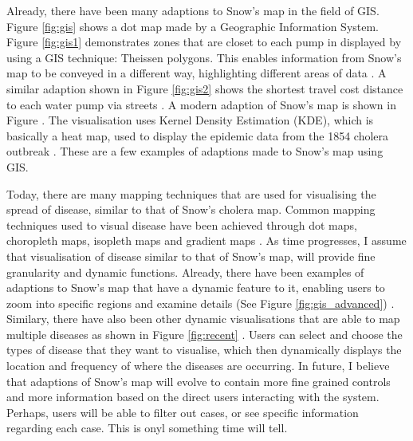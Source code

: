 \documentclass[12pt]{article}
\begin{document}
Already, there have been many adaptions to Snow's map in the field of GIS. Figure \ref{fig:gis} shows a dot map made by a Geographic Information System. Figure \ref{fig:gis1} demonstrates zones that are closet to each pump in displayed by using a GIS technique: Theissen polygons. This enables information from Snow's map to be conveyed in a different way, highlighting different areas of data \cite{udel2}. A similar adaption shown in Figure \ref{fig:gis2} shows the shortest travel cost distance to each water pump via streets \cite{udel2}. A modern adaption of Snow's map is shown in Figure \cite{fig:heatmap}. The visualisation uses Kernel Density Estimation (KDE), which is basically a heat map, used to display the epidemic data from the 1854 cholera outbreak \cite{heatmap}. These are a few examples of adaptions made to Snow's map using GIS. 

Today, there are many mapping techniques that are used for visualising the spread of disease, similar to that of Snow's cholera map. Common mapping techniques used to visual disease have been achieved through dot maps, choropleth maps, isopleth maps and gradient maps \cite{recent}. As time progresses, I assume that visualisation of disease similar to that of Snow's map, will provide fine granularity and dynamic functions. Already, there have been examples of adaptions to Snow's map that have a dynamic feature to it, enabling users to zoom into specific regions and examine details (See Figure \ref{fig:gis_advanced}) \cite{advanced}. Similary, there have also been other dynamic visualisations that are able to map multiple diseases as shown in Figure \ref{fig:recent} \cite{recent}. Users can select and choose the types of disease that they want to visualise, which then dynamically displays the location and frequency of where the diseases are occurring. In future, I believe that adaptions of Snow's map will evolve to contain more fine grained controls and more information based on the direct users interacting with the system. Perhaps, users will be able to filter out cases, or see specific information regarding each case. This is onyl something time will tell.
\end{document}
